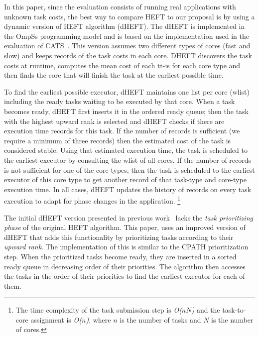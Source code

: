 In this paper, since the evaluation consists of running real applications with unknown task costs, the best way to compare HEFT to our proposal is by using a dynamic version of HEFT algorithm (dHEFT).
The dHEFT is implemented in the OmpSs programming model and is based on the implementation used in the evaluation of CATS~\cite{Chronaki:ICS2015}.
This version assumes two different types of cores (fast and slow) and keeps records of the task costs in each core.
DHEFT discovers the task costs at runtime, computes the mean cost of each tt-is for each core type and then finds the core that will finish the task at the earliest possible time.

To find the earliest possible executor, dHEFT maintains
one list per core (wlist) including the ready tasks waiting
to be executed by that core. 
When a task becomes ready, dHEFT first inserts it in the ordered ready queue; then the task with the highest upward rank is selected and dHEFT checks if there are execution time records for this task. 
If the number of records is sufficient (we require a minimum of three records)
then the estimated cost of the task is considered stable. 
Using that estimated execution time, the task
is scheduled to the earliest executor by consulting the wlist
of all cores. If the number of records is not sufficient
for one of the core types, then the task is scheduled to the
earliest executor of this core type to get another record of
that task-type and core-type execution time. In all cases,
dHEFT updates the history of records on every task execution to adapt for phase changes in the application. \footnote{The time complexity of the task submission step is \textit{O($nN$)} and the task-to-core assignment is \textit{O($n$)}, where \textit{$n$} is the number of tasks and \textit{$N$} is the number of cores.}

The initial dHEFT version presented in previous work~\cite{Chronaki:ICS2015} lacks the \textit{task prioritizing phase} of the original HEFT algorithm.
This paper, uses an improved version of dHEFT that adds this functionality by prioritizing tasks according to their \textit{upward rank}.
The implementation of this is similar to the CPATH prioritization step.
When the prioritized tasks become ready, they are inserted in a sorted ready queue in decreasing order of their priorities.
The algorithm then accesses the tasks in the order of their priorities to find the earliest executor for each of them.
